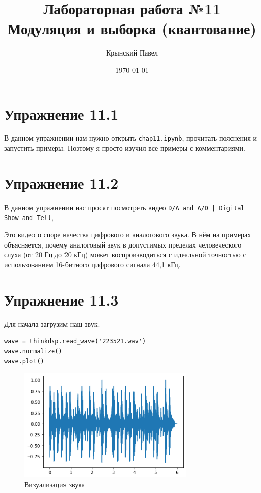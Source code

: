 \documentclass[a4paper,12pt]{report}
\title{Лабораторная работа №11\\Модуляция и выборка (квантование)}
\author{Крынский Павел}
\date{\today}
\begin{document}
\maketitle
\tableofcontents
\listoffigures
\lstlistoflistings

\maketitle

\chapter{Упражнение 11.1}

В данном упражнении нам нужно открыть \texttt{chap11.ipynb}, прочитать пояснения и  запустить примеры. Поэтому я просто изучил все примеры с комментариями. 

\chapter{Упражнение 11.2}

В данном упражнении нас просят посмотреть видео \texttt{D/A and A/D | Digital Show and Tell}, 

Это видео о споре качества цифрового и аналогового звука. В нём на примерах объясняется, почему аналоговый звук в допустимых пределах человеческого слуха (от 20 Гц до 20 кГц) может воспроизводиться с идеальной точностью с использованием 16-битного цифрового сигнала 44,1 кГц.

\chapter{Упражнение 11.3}

Для начала загрузим наш звук.

\begin{lstlisting}[caption=Загрузка звука]
wave = thinkdsp.read_wave('223521.wav')
wave.normalize()
wave.plot()
\end{lstlisting}

\begin{figure}[H]
        \centering
        \includegraphics[width=0.75\textwidth]{1.png}
        \caption{Визуализация звука}
        \label{1}
\end{figure}
\end{document}

